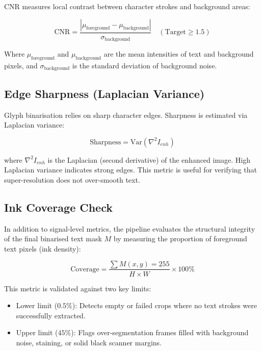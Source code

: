 CNR measures local contrast between character strokes and background areas:

\begin{equation}
\text{CNR} = \frac{|\mu_{\text{foreground}} - \mu_{\text{background}}|}{\sigma_{\text{background}}} \quad (\text{Target} \ge 1.5)
\end{equation}

Where $\mu_{\text{foreground}}$ and $\mu_{\text{background}}$ are the mean intensities of text and background pixels, and $\sigma_{\text{background}}$ is the standard deviation of background noise.

\subsection{Edge Sharpness (Laplacian Variance)}

Glyph binarisation relies on sharp character edges. Sharpness is estimated via Laplacian variance:

\begin{equation}
\text{Sharpness} = \text{Var}(\nabla^2 I_{enh})
\end{equation}

where $\nabla^2 I_{enh}$ is the Laplacian (second derivative) of the enhanced image. High Laplacian variance indicates strong edges. This metric is useful for verifying that super-resolution does not over-smooth text.

\subsection{Ink Coverage Check}

In addition to signal-level metrics, the pipeline evaluates the structural integrity of the final binarised text mask $M$ by measuring the proportion of foreground text pixels (ink density):

\begin{equation}
\text{Coverage} = \frac{\sum M(x, y) = 255}{H \times W} \times 100\%
\end{equation}

This metric is validated against two key limits:
\begin{itemize}
	\item Lower limit ($0.5\%$): Detects empty or failed crops where no text strokes were successfully extracted.
	\item Upper limit ($45\%$): Flags over-segmentation frames filled with background noise, staining, or solid black scanner margins.
\end{itemize}

